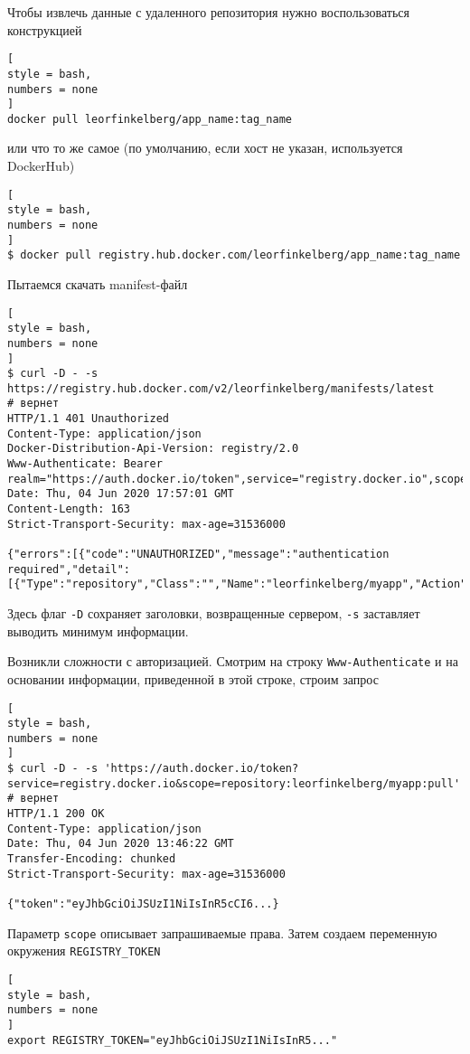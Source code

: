 \documentclass[%
	11pt,
	a4paper,
	utf8,
		]{article}
\begin{document}
Чтобы извлечь данные с удаленного репозитория нужно воспользоваться конструкцией
\begin{lstlisting}[
style = bash,
numbers = none
]
docker pull leorfinkelberg/app_name:tag_name
\end{lstlisting}
или что то же самое (по умолчанию, если хост не указан, используется DockerHub)
\begin{lstlisting}[
style = bash,
numbers = none
]
$ docker pull registry.hub.docker.com/leorfinkelberg/app_name:tag_name
\end{lstlisting}

Пытаемся скачать manifest-файл
\begin{lstlisting}[
style = bash,
numbers = none
]
$ curl -D - -s https://registry.hub.docker.com/v2/leorfinkelberg/manifests/latest
# вернет
HTTP/1.1 401 Unauthorized
Content-Type: application/json
Docker-Distribution-Api-Version: registry/2.0
Www-Authenticate: Bearer realm="https://auth.docker.io/token",service="registry.docker.io",scope="repository:leorfinkelberg/myapp:pull"
Date: Thu, 04 Jun 2020 17:57:01 GMT
Content-Length: 163
Strict-Transport-Security: max-age=31536000

{"errors":[{"code":"UNAUTHORIZED","message":"authentication required","detail":[{"Type":"repository","Class":"","Name":"leorfinkelberg/myapp","Action":"pull"}]}]}
\end{lstlisting}

Здесь флаг \verb|-D| сохраняет заголовки, возвращенные сервером, \verb|-s| заставляет выводить минимум информации.

Возникли сложности с авторизацией. Смотрим на строку \texttt{Www-Authenticate} и на основании информации, приведенной в этой строке, строим запрос
\begin{lstlisting}[
style = bash,
numbers = none
]
$ curl -D - -s 'https://auth.docker.io/token?service=registry.docker.io&scope=repository:leorfinkelberg/myapp:pull'
# вернет
HTTP/1.1 200 OK
Content-Type: application/json
Date: Thu, 04 Jun 2020 13:46:22 GMT
Transfer-Encoding: chunked
Strict-Transport-Security: max-age=31536000

{"token":"eyJhbGciOiJSUzI1NiIsInR5cCI6...}
\end{lstlisting}

Параметр \verb|scope| описывает запрашиваемые права. Затем создаем переменную окружения \texttt{REGISTRY\_TOKEN}
\begin{lstlisting}[
style = bash,
numbers = none
]
export REGISTRY_TOKEN="eyJhbGciOiJSUzI1NiIsInR5..."
\end{lstlisting}
\end{document}
